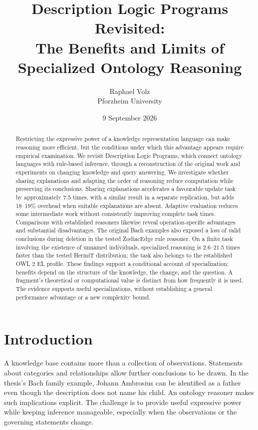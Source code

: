 \documentclass{article}
\title{Description Logic Programs Revisited:\\The Benefits and Limits of Specialized Ontology Reasoning}
\author{Raphael Volz\\Pforzheim University}
\date{9 September 2026}
\begin{document}
\maketitle
\begin{abstract}
Restricting the expressive power of a knowledge representation language can
make reasoning more efficient, but the conditions under which this advantage
appears require empirical examination. We revisit Description Logic Programs,
which connect ontology languages with rule-based inference, through a
reconstruction of the original work and experiments on changing knowledge and
query answering. We investigate whether sharing explanations and adapting the
order of reasoning reduce computation while preserving its conclusions.
Sharing explanations accelerates a favourable update task by approximately
7.5 times, with a similar result in a separate replication, but adds 18--19\%
overhead when suitable explanations are absent. Adaptive evaluation reduces
some intermediate work without consistently improving complete task times.
Comparisons with established reasoners likewise reveal operation-specific
advantages and substantial disadvantages. The original Bach examples also
exposed a loss of valid conclusions during deletion in the tested ZodiacEdge
rule reasoner. On a finite task involving the
existence of unnamed individuals, specialized reasoning is 2.6--21.5 times
faster than the tested HermiT distribution; the task also belongs to the
established OWL 2 EL profile. These findings support a conditional account of
specialization: benefits depend on the structure of the knowledge, the change,
and the question. A fragment's theoretical or computational value is distinct
from how frequently it is used. The evidence supports useful specializations,
without establishing a general performance advantage or a new complexity bound.
\end{abstract}

\section{Introduction}
A knowledge base contains more than a collection of observations. Statements
about categories and relationships allow further conclusions to be drawn.
In the thesis's Bach family example, Johann Ambrosius can be identified as a
father even though the description does not name his child. An ontology
reasoner makes such implications explicit.
The challenge is to provide useful expressive power while keeping inference
manageable, especially when the observations or the governing statements
change.
\end{document}
